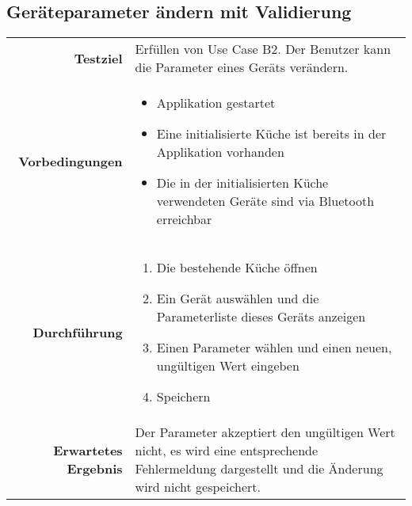 \subsection{Geräteparameter ändern mit Validierung}
\begin{table}[H]
\begin{tabularx}{\textwidth}{r X }
\textbf{Testziel} & Erfüllen von Use Case B2. Der Benutzer kann die Parameter eines Geräts verändern. \\
\textbf{Vorbedingungen} & \begin{itemize}
\item Applikation gestartet
\item Eine initialisierte Küche ist bereits in der Applikation vorhanden
\item Die in der initialisierten Küche verwendeten Geräte sind via Bluetooth erreichbar
\end{itemize} \\
\textbf{Durchführung} & \begin{enumerate}
\item Die bestehende Küche öffnen
\item Ein Gerät auswählen und die Parameterliste dieses Geräts anzeigen
\item Einen Parameter wählen und einen neuen, ungültigen Wert eingeben
\item Speichern
\end{enumerate} \\
\textbf{Erwartetes Ergebnis} & Der Parameter akzeptiert den ungültigen Wert nicht, es wird eine entsprechende Fehlermeldung dargestellt und die Änderung wird nicht gespeichert.\\
\end{tabularx}
\end{table}

